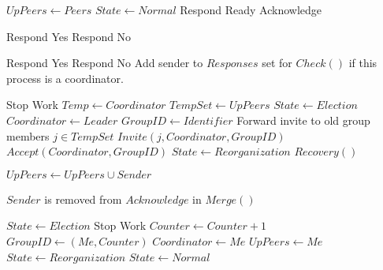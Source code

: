 \begin{algorithmic}
\State

        \State $UpPeers \gets Peers$
        \State $State \gets Normal$
        \State Respond Ready Acknowledge
    \EndIf
\EndFunction

\State

        \State Respond Yes
    \Else
        \State Respond No
    \EndIf
\EndFunction

\State

        \State Respond Yes
    \Else
        \State Respond No
        \State Add sender to $Responses$ set for $Check()$ if this process is a coordinator.
    \EndIf
\EndFunction

\State

        \Return
    \EndIf
        \Return
    \EndIf
    \State Stop Work
    \State $Temp \gets Coordinator$
    \State $TempSet \gets UpPeers$
    \State $State \gets Election$
    \State $Coordinator \gets Leader$
    \State $GroupID \gets Identifier$
        \State Forward invite to old group members
        \For $j \in TempSet$
            \State $Invite(j,Coordinator,GroupID)$
        \EndFor
    \EndIf
    \State $Accept(Coordinator,GroupID)$
    \State $State \gets Reorganization$
        \State $Recovery()$
    \EndIf
\EndFunction

\State

        \State $UpPeers \gets UpPeers \cup {Sender}$
    \EndIf
\EndFunction

    \State $Sender$ is removed from $Acknowledge$ in $Merge()$
\EndFunction

\State

    \State $State \gets Election$
    \State Stop Work
    \State $Counter \gets Counter + 1$
    \State $GroupID \gets (Me,Counter)$
    \State $Coordinator \gets Me$
    \State $UpPeers \gets {Me}$
    \State $State \gets Reorganization$
    \State $State \gets Normal$
\EndFunction

\end{algorithmic}
